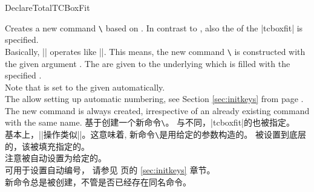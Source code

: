 \begin{docCommand}{DeclareTotalTCBoxFit}{}
\begin{stripedbox}
Creates a new command \texttt{\textbackslash} based on .
In contrast to , also the  of the |tcboxfit| is specified.\\
Basically, |\DeclareTotalTCBoxFit| operates like |\DeclareDocumentCommand|. This means,
the new command \texttt{\textbackslash} is constructed with the given argument .
The  are given to the underlying  which is filled with
the specified .\\
Note that  is set to the given 
automatically.\\
The  allow setting up automatic numbering,
see Section \ref{sec:initkeys} from page \pageref{sec:initkeys}.\\
The new command is always created, irrespective of an already existing
command with the same name.
\tcblower
基于创建一个新命令\texttt{\textbackslash}。
与不同，|tcboxfit|的也被指定。\\
基本上，|\DeclareTotalTCBoxFit|操作类似|\DeclareDocumentCommand|。这意味着,
新命令\texttt{\textbackslash}是用给定的参数构造的。
被设置到底层的，该被填充指定的。\\
注意被自动设置为给定的。\\
可用于设置自动编号，
请参见 \pageref{sec:initkeys} 页的 \ref{sec:initkeys} 章节。\\
新命令总是被创建，不管是否已经存在同名命令。
\end{stripedbox}

\end{docCommand}

